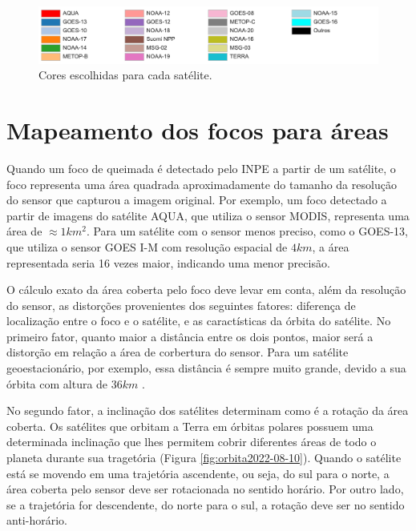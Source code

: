 \documentclass[cic,tc]{iiufrgs}
\begin{document}
\begin{figure}[!htb]
    \caption{Cores escolhidas para cada satélite.}
    \begin{center}
        \includegraphics[width=35em]{cores_satelites}
    \end{center}
    \label{fig:cores_satelites}
\end{figure}


\section{Mapeamento dos focos para áreas}
\label{sec:focos_para_areas}

Quando um foco de queimada é detectado pelo INPE a partir de um satélite, o foco representa uma área quadrada aproximadamente do tamanho da resolução do sensor que capturou a imagem original. Por exemplo, um foco detectado a partir de imagens do satélite AQUA, que utiliza o sensor MODIS, representa uma área de $\approx1 km^2$. Para um satélite com o sensor menos preciso, como o GOES-13, que utiliza o sensor GOES I-M com resolução espacial de $4 km$, a área representada seria 16 vezes maior, indicando uma menor precisão.

O cálculo exato da área coberta pelo foco deve levar em conta, além da resolução do sensor, as distorções provenientes dos seguintes fatores: diferença de localização entre o foco e o satélite, e as caractísticas da órbita do satélite. No primeiro fator, quanto maior a distância entre os dois pontos, maior será a distorção em relação a área de corbertura do sensor. Para um satélite geoestacionário, por exemplo, essa distância é sempre muito grande, devido a sua órbita com altura de $36 km$ \citep{EmbrapaSatelites}.

No segundo fator, a inclinação dos satélites determinam como é a rotação da área coberta. Os satélites que orbitam a Terra em órbitas polares possuem uma determinada inclinação que lhes permitem cobrir diferentes áreas de todo o planeta durante sua tragetória (Figura \ref{fig:orbita2022-08-10}). Quando o satélite está se movendo em uma trajetória ascendente, ou seja, do sul para o norte, a área coberta pelo sensor deve ser rotacionada no sentido horário. Por outro lado, se a trajetória for descendente, do norte para o sul, a rotação deve ser no sentido anti-horário.
\end{document}
